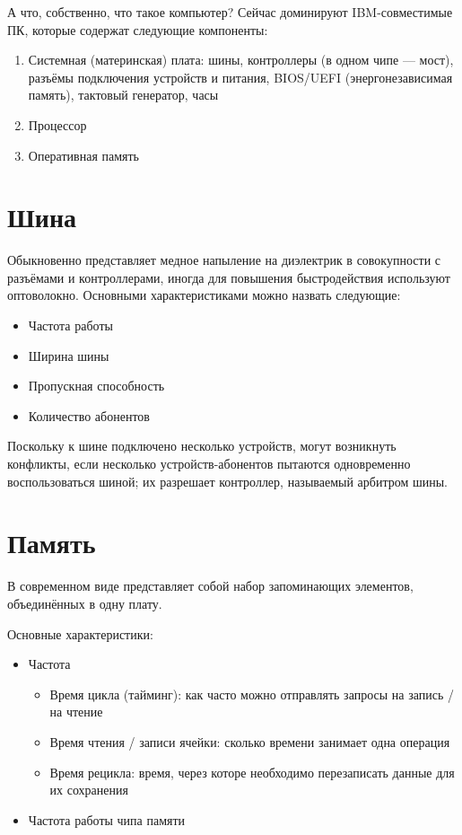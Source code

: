 \documentclass[main]{subfiles}
\begin{document}
А что, собственно, что такое компьютер? Сейчас доминируют IBM-совместимые ПК, которые
содержат следующие компоненты:
\begin{enumerate}
\item Системная (материнская) плата: шины, контроллеры (в одном чипе --- мост),
разъёмы подключения устройств и питания, BIOS/UEFI (энергонезависимая память),
тактовый генератор, часы
\item Процессор
\item Оперативная память
\end{enumerate}

\section{Шина}
Обыкновенно представляет медное напыление на диэлектрик в совокупности с
разъёмами и контроллерами, иногда для повышения
быстродействия используют оптоволокно. Основными характеристиками
можно назвать следующие:
\begin{itemize}
\item Частота работы
\item Ширина шины
\item Пропускная способность
\item Количество абонентов
\end{itemize}
Поскольку к шине подключено несколько устройств, могут возникнуть конфликты,
если несколько устройств-абонентов пытаются одновременно воспользоваться шиной;
их разрешает контроллер, называемый арбитром шины.

\section{Память}
В современном виде представляет собой набор запоминающих элементов,
объединённых в одну плату.

Основные характеристики:
\begin{itemize}
\item Частота
\begin{itemize}
\item Время цикла (тайминг): как часто можно отправлять запросы на запись / на чтение
\item Время чтения / записи ячейки: сколько времени занимает одна операция
\item Время рецикла: время, через которе необходимо перезаписать данные для
их сохранения
\end{itemize}
\item Частота работы чипа памяти
\end{itemize}
\end{document}
